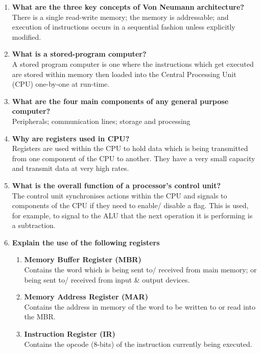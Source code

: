 
\begin{enumerate}
    \item \textbf{What are the three key concepts of Von Neumann architecture?}\\
    There is a single read-write memory; the memory is addressable; and execution of instructions occurs in a sequential fashion unless explicitly modified.
    \item \textbf{What is a stored-program computer?}\\
    A stored program computer is one where the instructions which get executed are stored within memory then loaded into the Central Processing Unit (CPU) one-by-one at run-time.
    \item \textbf{What are the four main components of any general purpose computer?}\\
    Peripherals; communication lines; storage and processing
    \item \textbf{Why are registers used in CPU?}\\
    Registers are used within the CPU to hold data which is being transmitted from one component of the CPU to another. They have a very small capacity and transmit data at very high rates.
    \item \textbf{What is the overall function of a processor's control unit?}\\
    The control unit synchronises actions within the CPU and signals to components of the CPU if they need to enable/ disable a flag. This is used, for example, to signal to the ALU that the next operation it is performing is a subtraction.
    \item \textbf{Explain the use of the following registers}
    \begin{enumerate}
        \item \textbf{Memory Buffer Register (MBR)}\\
        Contains the word which is being sent to/ received from main memory; or being sent to/ received from input \& output devices.
        \item \textbf{Memory Address Register (MAR)}\\
        Contains the address in memory of the word to be written to or read into the MBR.
        \item \textbf{Instruction Register (IR)}\\
        Contains the opcode (8-bits) of the instruction currently being executed.

\end{enumerate}
\end{enumerate}

